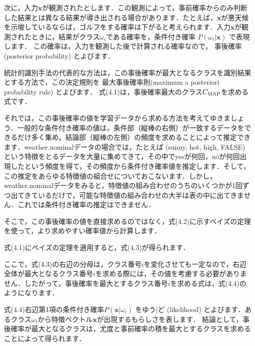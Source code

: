 
次に，入力$\bm{x}$が観測されたとします．この観測によって，事前確率からのみ判断した結果とは異なる結果が導き出される場合があります．たとえば，$\bm{x}$が悪天候を示唆しているならば，ゴルフをする確率は下がると考えられます．入力$\bm{x}$が観測されたときに，結果がクラス$\omega_i$である確率を，条件付き確率 $P(\omega_i \vert \bm{x})$ で表現します．
この確率は，入力を観測した後で計算される確率なので，
事後確率 (posterior probability) 
とよびます．

統計的識別手法の代表的な方法は，この事後確率が最大となるクラスを識別結果とする方法で，この決定規則を
最大事後確率則(maximum a posteriori probability rule)
とよびます．
式(4.1)は，事後確率最大のクラス$C_{\mbox{\scriptsize{MAP}}}$を求める式です．


それでは，この事後確率の値を学習データから求める方法を考えてゆきましょう．一般的な条件付き確率の値は，条件部（縦棒の右側）が一致するデータをできるだけ多く集め，結論部（縦棒の左側）の頻度を求めることによって推定できます．weather.nominalデータの場合では，たとえば (sunny, hot, high, FALSE) という特徴をとるデータを大量に集めてきて，その中でyesが何回，noが何回出現したという頻度を得て，その頻度から条件付き確率値を推定します．そして，この推定をあらゆる特徴値の組合せについておこないます．しかし，weather.nominalデータをみると，特徴値の組み合わせのうちのいくつかが1回ずつ出てきているだけで，可能な特徴値の組み合わせの大半は表の中に出てきません．これでは条件付き確率の推定はできません．

そこで，この事後確率の値を直接求めるのではなく，式(4.2)に示すベイズの定理
を使って，より求めやすい確率値から計算します．


式(4.1)にベイズの定理を適用すると，式(4.3)が得られます．


ここで，式(4.3)の右辺の分母は，クラス番号$i$を変化させても一定なので，右辺全体が最大となるクラス番号$i$を求める際には，その値を考慮する必要がありません．したがって，事後確率を最大とするクラス番号$i$を求める式は，式(4.4)のようになります．



式(4.4)右辺第1項の条件付き確率$P(\bm{x} \vert \omega_i)$
を{ゆう|ど} (likelihood) 
とよびます．あるクラス$\omega_i$から特徴ベクトル$\bm{x}$が出現するもらしさを表します．
結論として，事後確率が最大となるクラスは，尤度と事前確率の積を最大とするクラスを求めることによって得られます．

